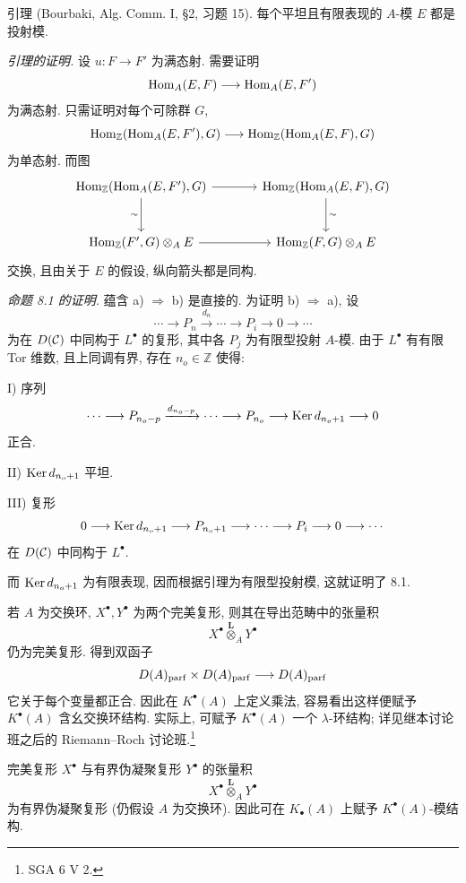 \begin{statement}{引理}
(Bourbaki, Alg. Comm. I, §2, 习题 15). 每个平坦且有限表现的 $A$-模 $E$ 都是投射模.
\end{statement}

\emph{引理的证明.} 设 $u:F\to F'$ 为满态射. 需要证明
\[
\operatorname{Hom}_A(E,F)\longrightarrow\operatorname{Hom}_A(E,F')
\]
为满态射. 只需证明对每个可除群 $G$,
\[
\operatorname{Hom}_{\mathbb Z}(\operatorname{Hom}_A(E,F'),G)\longrightarrow
\operatorname{Hom}_{\mathbb Z}(\operatorname{Hom}_A(E,F),G)
\]
为单态射. 而图
\[
\begin{tikzcd}[column sep=large,row sep=large]
\Hom_{\mathbb Z}(\Hom_A(E,F'),G)
 \arrow[r]\arrow[d,"\sim"']&
\Hom_{\mathbb Z}(\Hom_A(E,F),G)\arrow[d,"\sim"]\\
\Hom_{\mathbb Z}(F',G)\otimes_A E
 \arrow[r]&
\Hom_{\mathbb Z}(F,G)\otimes_A E
\end{tikzcd}
\]
交换, 且由关于 $E$ 的假设, 纵向箭头都是同构.

\emph{命题 8.1 的证明.} 蕴含 a) $\Rightarrow$ b) 是直接的. 为证明 b) $\Rightarrow$ a), 设
\[
\cdots\longrightarrow P_n\xrightarrow{d_n}\cdots\longrightarrow P_i\longrightarrow 0\longrightarrow\cdots
\]
为在 $D(\mathcal C)$ 中同构于 $L^\bullet$ 的复形, 其中各 $P_j$ 为有限型投射 $A$-模. 由于 $L^\bullet$ 有有限 Tor 维数, 且上同调有界, 存在 $n_o\in\mathbb Z$ 使得:

I) 序列
\[
\cdots\longrightarrow P_{n_o-p}\xrightarrow{d_{n_o-p}}\cdots\longrightarrow
P_{n_o}\longrightarrow \operatorname{Ker} d_{n_o+1}\longrightarrow0
\]
正合.

II) $\operatorname{Ker} d_{n_o+1}$ 平坦.

III) 复形
\[
0\longrightarrow \operatorname{Ker} d_{n_o+1}\longrightarrow P_{n_o+1}\longrightarrow\cdots\longrightarrow P_i\longrightarrow0\longrightarrow\cdots
\]
在 $D(\mathcal C)$ 中同构于 $L^\bullet$.

而 $\operatorname{Ker} d_{n_o+1}$ 为有限表现, 因而根据引理为有限型投射模, 这就证明了 8.1.

若 $A$ 为交换环, $X^\bullet,Y^\bullet$ 为两个完美复形, 则其在导出范畴中的张量积
\[
X^\bullet\overset{\mathbf L}{\otimes}_A Y^\bullet
\]
仍为完美复形. 得到双函子
\[
D(A)_{\mathrm{parf}}\times D(A)_{\mathrm{parf}}\longrightarrow D(A)_{\mathrm{parf}}
\]
它关于每个变量都正合. 因此在 $K^\bullet(A)$ 上定义乘法, 容易看出这样便赋予 $K^\bullet(A)$ 含幺交换环结构. 实际上, 可赋予 $K^\bullet(A)$ 一个 $\lambda$-环结构; 详见继本讨论班之后的 Riemann--Roch 讨论班.\footnote{SGA 6 V 2.}

完美复形 $X^\bullet$ 与有界伪凝聚复形 $Y^\bullet$ 的张量积
\[
X^\bullet\overset{\mathbf L}{\otimes}_A Y^\bullet
\]
为有界伪凝聚复形 (仍假设 $A$ 为交换环). 因此可在 $K_\bullet(A)$ 上赋予 $K^\bullet(A)$-模结构.

